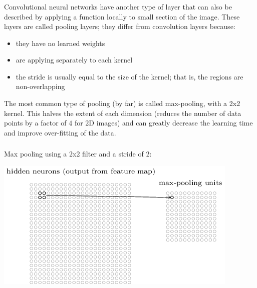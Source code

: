 \documentclass[xetex,mathserif,serif,aspectratio=169]{beamer}
\begin{document}
\begin{frame}[fragile] \frametitle{} \oldB \small

\textbf{}

Convolutional neural networks have another type of layer that can
also be described by applying a function locally to small section
of the image. These layers are called pooling layers; they differ
from convolution layers because:
\begin{itemize}
\item they have no learned weights
\item are applying separately to each kernel
\item the stride is usually equal to the size of the kernel; that is,
the regions are non-overlapping
\end{itemize}
The most common type of pooling (by far) is called max-pooling, with
a 2x2 kernel. This halves the extent of each dimension (reduces the
number of data points by a factor of $4$ for 2D images) and can greatly
decrease the learning time and improve over-fitting of the data.

\end{frame}

\begin{frame}[fragile] \frametitle{} \oldB \small

Max pooling using a 2x2 filter and a stride of $2$:

\begin{center}
\includegraphics[height=0.7\textheight]{img/tikz47.png}
\end{center}

\end{frame}
\end{document}
